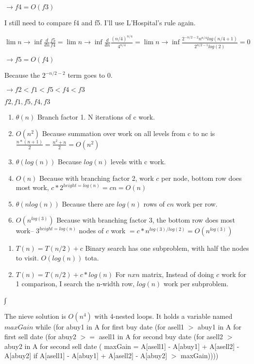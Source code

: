 \documentclass[12pt,twoside]{article}
\begin{document}
\begin{problems}
\begin{problemparts}
$ \rightarrow f4 = O(f3) $

I still need to compare f4 and f5. I'll use L'Hospital's rule again.

$ \lim n \rightarrow \inf \frac{d}{dn} \frac{f5}{f4} = \lim n \rightarrow \inf \frac{d}{dn} \frac{(n/4)^{n/4}}{4^{n/4}} = \lim n \rightarrow \inf \frac{2^{-n/2 -2}n^{n/4}log(n/4 +1)}{2^{n/2 -1}log(2)} = 0 $

$ \rightarrow f5 = O(f4) $

Because the $2^{-n/2 -2}$ term goes to $0$.

$ \rightarrow f2 < f1 < f5 < f4 < f3 $

$ f2, f1, f5, f4, f3 $

\end{problemparts}

\problem  %

\begin{problemparts}
\problempart
\begin{enumerate}
\item $\theta(n)$ Branch factor 1. N iterations of c work.
\item $O(n^2)$ Because summation over work on all levels from c to nc is $\frac{n*(n+1)}{2} = \frac{n^2 + n}{2} = O(n^2)$
\item $\theta(log(n))$ Because $log(n)$ levels with c work.
\item $O(n)$ Because with branching factor 2, work $c$ per node, bottom row does most work, $c*2^{height = log(n)} = cn = O(n)$
\item $\theta(nlog(n))$ Because there are $log(n)$ rows of $cn$ work per row.
\item $O(n^{log(3)})$ Because with branching factor 3, the bottom row does most work– $3^{height = log(n)}$ nodes of $c$ work $= c*n^{log(3)/log(2)} = O(n^{log(3)})$
\end{enumerate}
\problempart
\begin{enumerate}
\item $T(n) = T(n/2) + c$ Binary search has one subproblem, with half the nodes to visit. $O(log(n))$ tota.

\item $T(n) = T(n/2) + c*log(n)$ For $nxn$ matrix, Instead of doing $c$ work for 1 comparison, I search the n-width row, $log(n)$ work per subproblem.
\end{enumerate}∫
\end{problemparts}

\problem  %
\begin{problemparts}
\problempart The nieve solution is $O(n^4)$ with 4-nested loops. It holds a variable named $maxGain$ while (for abuy1 in A for first buy date (for asell1 $>$ abuy1 in A for first sell date (for abuy2 $>=$ asell1 in A for second buy date (for asell2 $>$ abuy2 in A for second sell date ( maxGain = A[asell1] - A[abuy1] + A[asell2] - A[abuy2] if A[asell1] - A[abuy1] + A[asell2] - A[abuy2] $>$ maxGain))))


\end{problemparts}
\end{problems}
\end{document}
